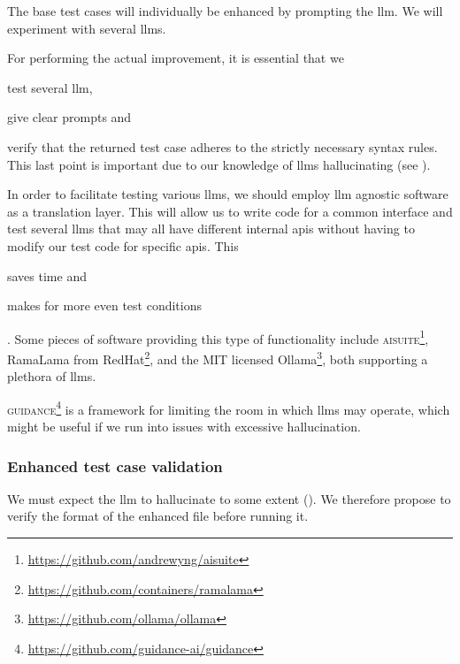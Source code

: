 The base test cases will individually be enhanced by prompting the
\acrshort{llm}. We will experiment with several \acrshort{llms}.

For performing the actual improvement, it is essential that we \begin{inparaenum}
    \item test several \acrshort{llm},
    \item give clear prompts
    and
    \item verify that the returned test case adheres to the strictly necessary
    syntax rules. This last point is important due to our knowledge of
    \acrshort{llms} hallucinating (see ).
\end{inparaenum}

In order to facilitate testing various \acrlong{llms}, we should employ
\acrshort{llm} agnostic software as a translation layer. This will allow us to
write code for a common interface and test several \acrshort{llms} that may all
have different internal \acrfull{apis} without having to modify our test code
for specific \acrshort{apis}. This \begin{inparaenum}
    \item saves time
    and
    \item makes for more even test conditions \end{inparaenum}. Some pieces of software providing
this type of functionality include
\textsc{aisuite}\footnote{\url{https://github.com/andrewyng/aisuite}}, RamaLama from
RedHat\footnote{\url{https://github.com/containers/ramalama}}, and the MIT licensed
Ollama\footnote{\url{https://github.com/ollama/ollama}}, both supporting a plethora of
\acrlong{llms}.

\textsc{guidance}\footnote{\url{https://github.com/guidance-ai/guidance}} is a
framework for limiting the room in which \acrshort{llms} may operate, which
might be useful if we run into issues with excessive hallucination.


\subsubsection{Enhanced test case validation}

We must expect the \acrshort{llm} to hallucinate to some extent (). We
therefore propose to verify the format of the enhanced file before running it.

